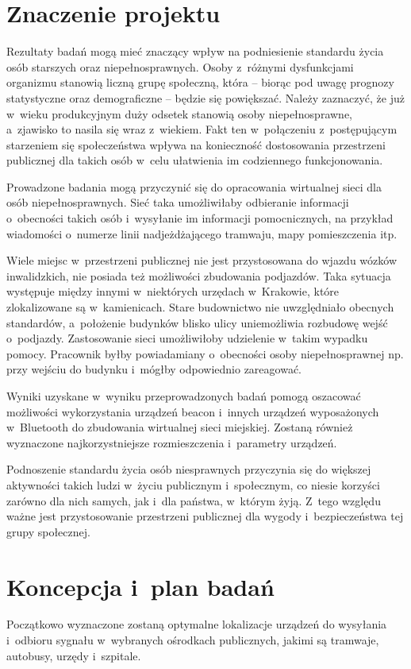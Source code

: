 \documentclass[a4paper]{article}
\begin{document}
\section{Znaczenie projektu}
Rezultaty badań mogą mieć znaczący wpływ na podniesienie standardu życia osób starszych oraz niepełnosprawnych. Osoby z~różnymi dysfunkcjami organizmu stanowią liczną grupę społeczną, która -- biorąc pod uwagę prognozy statystyczne oraz demograficzne -- będzie się powiększać. Należy zaznaczyć, że już w~wieku produkcyjnym duży odsetek stanowią osoby niepełnosprawne, a~zjawisko to nasila się wraz z~wiekiem. Fakt ten w~połączeniu z~postępującym starzeniem się społeczeństwa wpływa na konieczność dostosowania przestrzeni publicznej dla takich osób w~celu ułatwienia im codziennego funkcjonowania. 

Prowadzone badania mogą przyczynić się do opracowania wirtualnej sieci dla osób niepełnosprawnych. Sieć taka umożliwiłaby odbieranie informacji o~obecności takich osób i~wysyłanie im informacji pomocnicznych, na przykład wiadomości o~numerze linii nadjeżdżającego tramwaju, mapy pomieszczenia itp. 

Wiele miejsc w~przestrzeni publicznej nie jest przystosowana do wjazdu wózków inwalidzkich, nie posiada też możliwości zbudowania podjazdów. Taka sytuacja występuje między innymi w~niektórych urzędach w~Krakowie, które zlokalizowane są w~kamienicach. Stare budownictwo nie uwzględniało obecnych standardów, a~położenie budynków blisko ulicy uniemożliwia rozbudowę wejść o~podjazdy. Zastosowanie sieci umożliwiłoby udzielenie w~takim wypadku pomocy. Pracownik byłby powiadamiany o~obecności osoby niepełnosprawnej np. przy wejściu do budynku i~mógłby odpowiednio zareagować.

Wyniki uzyskane w~wyniku przeprowadzonych badań pomogą oszacować możliwości wykorzystania urządzeń beacon i~innych urządzeń wyposażonych w~Bluetooth do zbudowania wirtualnej sieci miejskiej. Zostaną również wyznaczone najkorzystniejsze rozmieszczenia i~parametry urządzeń.

Podnoszenie standardu życia osób niesprawnych przyczynia się do większej aktywności takich ludzi w~życiu publicznym i~społecznym, co niesie korzyści zarówno dla nich samych, jak i~dla państwa, w~którym żyją. Z~tego względu ważne jest przystosowanie przestrzeni publicznej dla wygody i~bezpieczeństwa tej grupy społecznej.

\section{Koncepcja i~plan badań}
Początkowo wyznaczone zostaną optymalne lokalizacje urządzeń do wysyłania i~odbioru sygnału w~wybranych ośrodkach publicznych, jakimi są tramwaje, autobusy, urzędy i~szpitale. 
\end{document}
